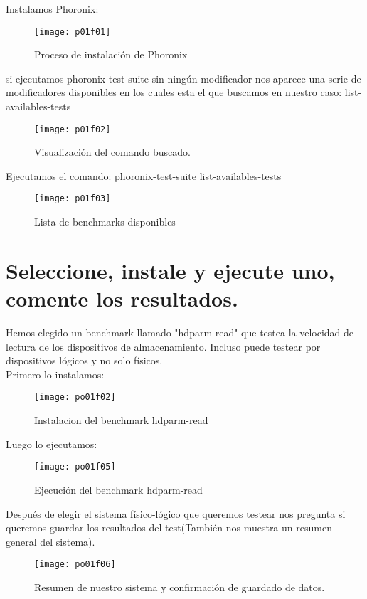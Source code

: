 Instalamos Phoronix:
\begin{figure}[H]
	\centering
	\texttt{[image: p01f01]}
	\caption{Proceso de instalación de Phoronix}
	\label{fig:p01f01}
\end{figure}

si ejecutamos phoronix-test-suite sin ningún modificador nos aparece una serie de modificadores disponibles en los cuales esta el que buscamos en nuestro caso: list-availables-tests

\begin{figure}[H]
	\centering
	\texttt{[image: p01f02]}
	\caption{Visualización del comando buscado.}
	\label{fig:p01f02}
\end{figure}

Ejecutamos el comando: phoronix-test-suite list-availables-tests 

\begin{figure}[H]
	\centering
	\texttt{[image: p01f03]}
	\caption{Lista de benchmarks disponibles}
	\label{fig:p01f03}
\end{figure}


\clearpage
\section{Seleccione, instale y ejecute uno, comente los	resultados.}

Hemos elegido un benchmark llamado "hdparm-read" que testea la velocidad de lectura de los dispositivos de almacenamiento. Incluso puede testear por dispositivos lógicos y no solo físicos.\\
Primero lo instalamos:
\begin{figure}[H]
	\centering
	\texttt{[image: po01f02]}
	\caption{Instalacion del benchmark hdparm-read}
	\label{fig:po01f02}
\end{figure}


Luego lo ejecutamos:
\begin{figure}[H]
	\centering
	\texttt{[image: po01f05]}
	\caption{Ejecución del benchmark hdparm-read}
	\label{fig:po01f05}
\end{figure}

Después de elegir el sistema físico-lógico que queremos testear nos pregunta si queremos guardar los resultados del test(También nos muestra un resumen general del sistema).
\begin{figure}[H]
	\centering
	\texttt{[image: po01f06]}
	\caption{Resumen de nuestro sistema y confirmación de guardado de datos.}
	\label{fig:po01f06}
\end{figure}

